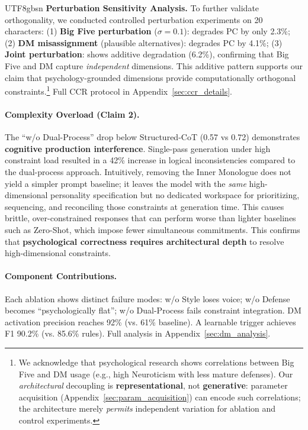 \documentclass[11pt]{article}
\begin{document}
\begin{CJK*}{UTF8}{gbsn}
\textbf{Perturbation Sensitivity Analysis.} To further validate orthogonality, we conducted controlled perturbation experiments on 20 characters: (1) \textbf{Big Five perturbation} ($\sigma=0.1$): degrades PC by only 2.3\%; (2) \textbf{DM misassignment} (plausible alternatives): degrades PC by 4.1\%; (3) \textbf{Joint perturbation}: shows additive degradation (6.2\%), confirming that Big Five and DM capture \textit{independent} dimensions. This additive pattern supports our claim that psychology-grounded dimensions provide computationally orthogonal constraints.\footnote{We acknowledge that psychological research shows correlations between Big Five and DM usage (e.g., high Neuroticism with less mature defenses). Our \textit{architectural} decoupling is \textbf{representational}, not \textbf{generative}: parameter acquisition (Appendix~\ref{sec:param_acquisition}) can encode such correlations; the architecture merely \textit{permits} independent variation for ablation and control experiments.} Full CCR protocol in Appendix~\ref{sec:ccr_details}.

\paragraph{Complexity Overload (Claim 2).} The ``w/o Dual-Process'' drop below Structured-CoT (0.57 vs 0.72) demonstrates \textbf{cognitive production interference}. Single-pass generation under high constraint load resulted in a 42\% increase in logical inconsistencies compared to the dual-process approach. Intuitively, removing the Inner Monologue does not yield a simpler prompt baseline; it leaves the model with the \textit{same} high-dimensional personality specification but no dedicated workspace for prioritizing, sequencing, and reconciling those constraints at generation time. This causes brittle, over-constrained responses that can perform worse than lighter baselines such as Zero-Shot, which impose fewer simultaneous commitments. This confirms that \textbf{psychological correctness requires architectural depth} to resolve high-dimensional constraints.

\paragraph{Component Contributions.} Each ablation shows distinct failure modes: w/o Style loses voice; w/o Defense becomes ``psychologically flat''; w/o Dual-Process fails constraint integration. DM activation precision reaches 92\% (vs. 61\% baseline). A learnable trigger achieves F1 90.2\% (vs. 85.6\% rules). Full analysis in Appendix~\ref{sec:dm_analysis}.


\end{CJK*}
\end{document}
